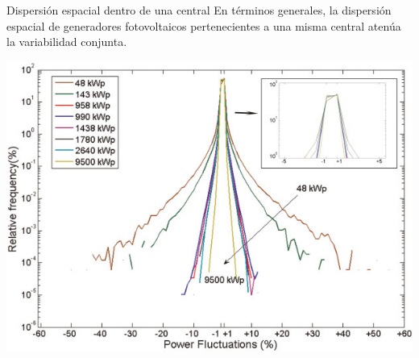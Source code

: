 \documentclass[aspectratio=169, usenames,svgnames,dvipsnames]{beamer}
\begin{document}
\begin{frame}[label={sec:orgf1a182b}]{Dispersión espacial dentro de una central}
En términos generales, la dispersión espacial de generadores
  fotovoltaicos pertenecientes a una misma central atenúa la
  variabilidad conjunta.

\begin{center}
\includegraphics[height=0.7\textheight]{../figs/Variabilidad_DispersionGeografica_Planta.png}
\end{center}
\end{frame}
\end{document}
